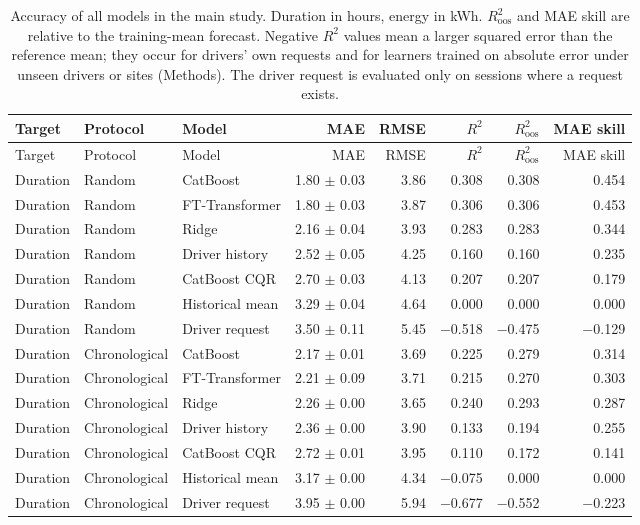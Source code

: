 {\footnotesize\begin{longtable}{lllrrrrr}
\caption{Accuracy of all models in the main study. Duration in hours, energy in kWh. $R^2_{\text{oos}}$ and MAE skill are relative to the training-mean forecast. Negative $R^2$ values mean a larger squared error than the reference mean; they occur for drivers\textquoteright{} own requests and for learners trained on absolute error under unseen drivers or sites (Methods). The driver request is evaluated only on sessions where a request exists.}\label{tab:s-acc}\\
\toprule
Target & Protocol & Model & MAE & RMSE & $R^2$ & $R^2_{\text{oos}}$ & MAE skill \\
\midrule
\endfirsthead
\toprule
Target & Protocol & Model & MAE & RMSE & $R^2$ & $R^2_{\text{oos}}$ & MAE skill \\
\midrule
\endhead
\bottomrule
\endfoot
Duration & Random & CatBoost & 1.80 $\pm$ 0.03 & 3.86 & 0.308 & 0.308 & 0.454 \\
Duration & Random & FT-Transformer & 1.80 $\pm$ 0.03 & 3.87 & 0.306 & 0.306 & 0.453 \\
Duration & Random & Ridge & 2.16 $\pm$ 0.04 & 3.93 & 0.283 & 0.283 & 0.344 \\
Duration & Random & Driver history & 2.52 $\pm$ 0.05 & 4.25 & 0.160 & 0.160 & 0.235 \\
Duration & Random & CatBoost CQR & 2.70 $\pm$ 0.03 & 4.13 & 0.207 & 0.207 & 0.179 \\
Duration & Random & Historical mean & 3.29 $\pm$ 0.04 & 4.64 & 0.000 & 0.000 & 0.000 \\
Duration & Random & Driver request & 3.50 $\pm$ 0.11 & 5.45 & $-$0.518 & $-$0.475 & $-$0.129 \\
Duration & Chronological & CatBoost & 2.17 $\pm$ 0.01 & 3.69 & 0.225 & 0.279 & 0.314 \\
Duration & Chronological & FT-Transformer & 2.21 $\pm$ 0.09 & 3.71 & 0.215 & 0.270 & 0.303 \\
Duration & Chronological & Ridge & 2.26 $\pm$ 0.00 & 3.65 & 0.240 & 0.293 & 0.287 \\
Duration & Chronological & Driver history & 2.36 $\pm$ 0.00 & 3.90 & 0.133 & 0.194 & 0.255 \\
Duration & Chronological & CatBoost CQR & 2.72 $\pm$ 0.01 & 3.95 & 0.110 & 0.172 & 0.141 \\
Duration & Chronological & Historical mean & 3.17 $\pm$ 0.00 & 4.34 & $-$0.075 & 0.000 & 0.000 \\
Duration & Chronological & Driver request & 3.95 $\pm$ 0.00 & 5.94 & $-$0.677 & $-$0.552 & $-$0.223 \\

\end{longtable}}

